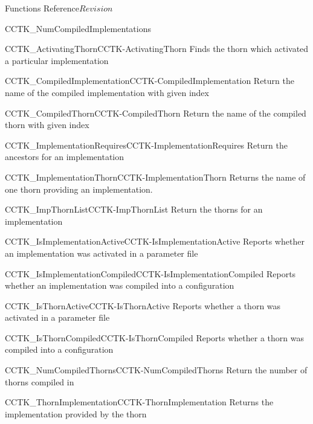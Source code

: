 \begin{cactuspart}{ Functions Reference}{}{$Revision$}
\begin{FunctionDescription}{CCTK\_NumCompiledImplementations}
\begin{SeeAlsoSection}
\begin{SeeAlso2}{CCTK\_ActivatingThorn}{CCTK-ActivatingThorn}
  Finds the thorn which activated a particular implementation
\end{SeeAlso2}
\begin{SeeAlso2}{CCTK\_CompiledImplementation}{CCTK-CompiledImplementation}
  Return the name of the compiled implementation with given index
\end{SeeAlso2}
\begin{SeeAlso2}{CCTK\_CompiledThorn}{CCTK-CompiledThorn}
  Return the name of the compiled thorn with given index
\end{SeeAlso2}
\begin{SeeAlso2}{CCTK\_ImplementationRequires}{CCTK-ImplementationRequires}
  Return the ancestors for an implementation
\end{SeeAlso2}
\begin{SeeAlso2}{CCTK\_ImplementationThorn}{CCTK-ImplementationThorn}
  Returns the name of one thorn providing an implementation.
\end{SeeAlso2}
\begin{SeeAlso2}{CCTK\_ImpThornList}{CCTK-ImpThornList}
  Return the thorns for an implementation
\end{SeeAlso2}
\begin{SeeAlso2}{CCTK\_IsImplementationActive}{CCTK-IsImplementationActive}
  Reports whether an implementation was activated in a parameter file
\end{SeeAlso2}
\begin{SeeAlso2}{CCTK\_IsImplementationCompiled}{CCTK-IsImplementationCompiled}
  Reports whether an implementation was compiled into a configuration
\end{SeeAlso2}
\begin{SeeAlso2}{CCTK\_IsThornActive}{CCTK-IsThornActive}
  Reports whether a thorn was activated in a parameter file
\end{SeeAlso2}
\begin{SeeAlso2}{CCTK\_IsThornCompiled}{CCTK-IsThornCompiled}
  Reports whether a thorn was compiled into a configuration
\end{SeeAlso2}
\begin{SeeAlso2}{CCTK\_NumCompiledThorns}{CCTK-NumCompiledThorns}
  Return the number of thorns compiled in
\end{SeeAlso2}
\begin{SeeAlso2}{CCTK\_ThornImplementation}{CCTK-ThornImplementation}
  Returns the implementation provided by the thorn
\end{SeeAlso2}
\end{SeeAlsoSection}


\end{FunctionDescription}
\end{cactuspart}
